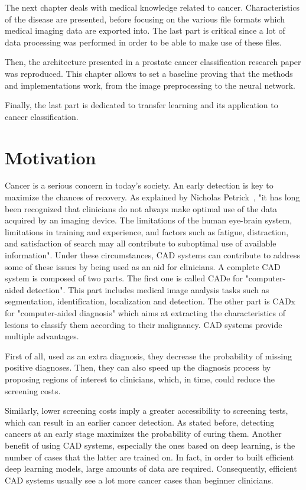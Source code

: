 The next chapter deals with medical knowledge related to cancer. Characteristics of the disease are presented, before focusing on the various file formats which medical imaging data are exported into. The last part is critical since a lot of data processing was performed in order to be able to make use of these files.

Then, the architecture presented in a prostate cancer classification research paper was reproduced. This chapter allows to set a baseline proving that the methods and implementations work, from the image preprocessing to the neural network.

Finally, the last part is dedicated to transfer learning and its application to cancer classification.



\section{Motivation}
\setlength{\marginparwidth}{3cm}\leavevmode {}Cancer is a serious concern in today's society. An early detection is key to maximize the chances of recovery. As explained by Nicholas Petrick~\cite{50}, "it has long been recognized that clinicians do not always make optimal use of the data acquired by an imaging device. The limitations of the human eye-brain system, limitations in training and experience, and factors such as fatigue, distraction, and satisfaction of search may all contribute to suboptimal use of available information". Under these circumstances, CAD systems can contribute to address some of these issues by being used as an aid for clinicians. A complete CAD system is composed of two parts. The first one is called CADe for "computer-aided detection". This part includes medical  image  analysis  tasks  such  as  segmentation,  identification,  localization  and  detection. The other part is CADx for "computer-aided diagnosis" which aims at extracting the characteristics of lesions to classify them according to their malignancy. CAD systems provide multiple advantages.

First of all, used as an extra diagnosis, they decrease the probability of missing positive diagnoses. Then, they can also speed up the diagnosis process by proposing regions of interest to clinicians, which, in time, could reduce the screening costs.

Similarly, lower screening costs imply a greater accessibility to screening tests, which can result in an earlier cancer detection. As stated before, detecting cancers at an early stage maximizes the probability of curing them. Another benefit of using CAD systems, especially the ones based on deep learning, is the number of cases that the latter are trained on. In fact, in order to built efficient deep learning models, large amounts of data are required. Consequently, efficient CAD systems usually see a lot more cancer cases than beginner clinicians.

